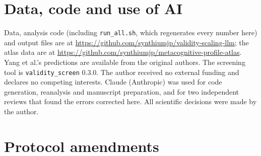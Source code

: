 \documentclass[11pt,a4paper]{article}
\begin{document}
\section*{Data, code and use of AI}\sloppy
Data, analysis code (including \texttt{run\_all.sh}, which regenerates every number here) and output files are at \url{https://github.com/synthiumjp/validity-scaling-llm}; the atlas data are at \url{https://github.com/synthiumjp/metacognitive-profile-atlas}. Yang et al.'s predictions are available from the original authors. The screening tool is \texttt{validity\_screen} 0.3.0. The author received no external funding and declares no competing interests. Claude (Anthropic) was used for code generation, reanalysis and manuscript preparation, and for two independent reviews that found the errors corrected here. All scientific decisions were made by the author.




\appendix

\section{Protocol amendments}\label{app:amend}
\end{document}
